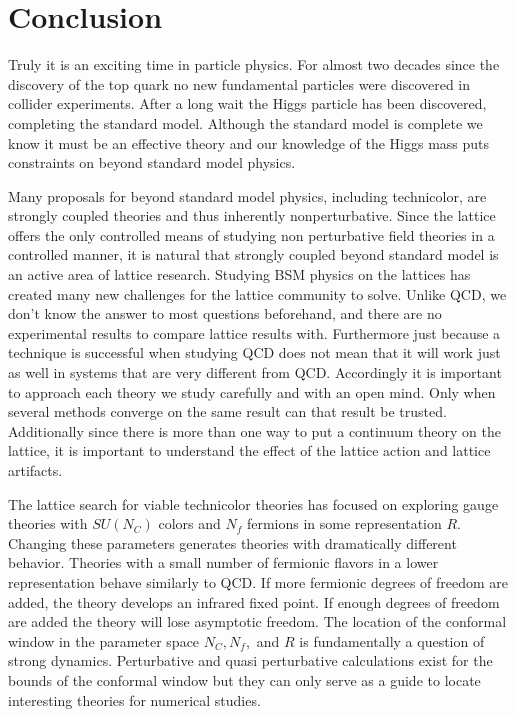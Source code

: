 \chapter{Conclusion}
\label{ch:conclusion}

Truly it is an exciting time in particle physics.
For almost two decades since the discovery of the top quark no new fundamental particles were discovered in collider experiments.
After a long wait the Higgs particle has been discovered, completing the standard model.
Although the standard model is complete we know it must be an effective theory and our knowledge of the Higgs mass puts constraints on beyond standard model physics.

Many proposals for beyond standard model physics, including technicolor, are strongly coupled theories and thus inherently nonperturbative.
Since the lattice offers the only controlled means of studying non perturbative field theories in a controlled manner, it is natural that strongly coupled beyond standard model is an active area of lattice research.
Studying BSM physics on the lattices has created many new challenges for the lattice community to solve.
Unlike QCD, we don't know the answer to most questions beforehand, and there are no experimental results to compare lattice results with.
Furthermore just because a technique is successful when studying QCD does not mean that it will work just as well in systems that are very different from QCD.
Accordingly it is important to approach each theory we study carefully and with an open mind.
Only when several methods converge on the same result can that result be trusted.
Additionally since there is more than one way to put a continuum theory on the lattice, it is important to understand the effect of the lattice action and lattice artifacts.

The lattice search for viable technicolor theories has focused on exploring gauge theories with $SU(N_C)$ colors and $N_f$ fermions in some representation $R$.
Changing these parameters generates theories with dramatically different behavior.
Theories with a small number of fermionic flavors in a lower representation behave similarly to QCD.
If more fermionic degrees of freedom are added, the theory develops an infrared fixed point.
If enough degrees of freedom are added the theory will lose asymptotic freedom.
The location of the conformal window in the parameter space $N_C, N_f,$ and $R$ is fundamentally a question of strong dynamics.
Perturbative and quasi perturbative calculations exist for the bounds of the conformal window but they can only serve as a guide to locate interesting theories for numerical studies.

